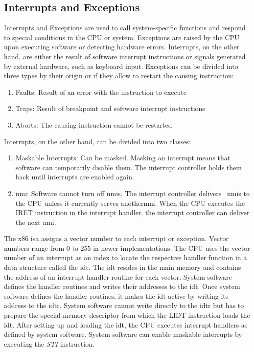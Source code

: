 \subsection{Interrupts and Exceptions}
\label{sec:state:technical:interrupts}
Interrupts and Exceptions are used to call system-specific functions and respond
to special conditions in the CPU or system. Exceptions are raised by the CPU
upon executing software or detecting hardware errors. Interrupts, on the other
hand, are either the result of software interrupt instructions or signals
generated by external hardware, such as keyboard input. Exceptions can be
divided into three types by their origin or if they allow to restart the causing
instruction:
\begin{enumerate}
  \item Faults: Result of an error with the instruction to execute
  \item Traps: Result of breakpoint and software interrupt instructions
  \item Aborts: The causing instruction cannot be restarted
\end{enumerate}
Interrupts, on the other hand, can be divided into two classes:
\begin{enumerate}
  \item Maskable Interrupts: Can be masked. Masking an interrupt means that
    software can temporarily disable them. The interrupt controller holds
    them back until interrupts are enabled again.
  \item \Gls{nmi}: Software cannot turn off \glspl{nmi}. The interrupt
    controller delivers~ \glspl{nmi} to the CPU unless it currently serves
    another\gls{nmi}. When the CPU executes the IRET instruction in the
    interrupt handler, the interrupt controller can deliver the next \gls{nmi}.
\end{enumerate}

The x86 \gls{isa} assigns a vector number to each interrupt or exception. Vector
numbers range from 0 to 255 in newer implementations. The CPU uses the vector
number of an interrupt as an index to locate the respective handler function in
a data structure called the \gls{idt}. The \gls{idt} resides in the main memory
and contains the address of an interrupt handler routine for each vector. System
software defines the handler routines and writes their addresses to the
\gls{idt}. Once system software defines the handler routines, it makes the
\gls{idt} active by writing its address to the \gls{idtr}. System software
cannot write directly to the \gls{idtr} but has to prepare the special memory
descriptor from which the LIDT instruction loads the \gls{idt}. After setting up
and loading the \gls{idt}, the CPU executes interrupt handlers as defined by
system software. System software can enable maskable interrupts by executing the
\textit{STI} instruction.\\

